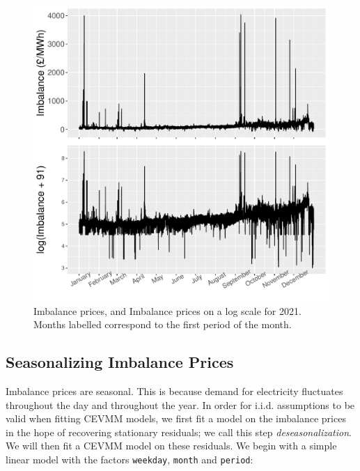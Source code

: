 \documentclass[11pt,twoside,openany]{book}
\newcommand{\code}[1]{\texttt{#1}}
\numberwithin{Theorem}{chapter}
\numberwithin{Definition}{chapter}
\numberwithin{Lemma}{chapter}
\numberwithin{Algorithm}{chapter}
\numberwithin{equation}{chapter}
\begin{document}
\FloatBarrier
\begin{figure}[htp]
  \centering
  \includegraphics[scale=0.75]{../elexon/figures/imbalance_whole_year.pdf}
  \caption{Imbalance prices, and Imbalance prices on a log scale for
  2021. Months labelled correspond to the first period of the month.}\label{fig:whole_year_imbalance_price}
\end{figure}



\subsection{Seasonalizing Imbalance Prices}

Imbalance prices are seasonal. This is because
demand for electricity fluctuates throughout the day and throughout the
year. In order for i.i.d. assumptions to be valid when fitting CEVMM models,
we first fit a model on the imbalance prices in the hope of recovering
stationary residuals; we call this step {\it deseasonalization}.
We will then fit a CEVMM model on these residuals.
We begin with a simple linear model with the factors \code{weekday}, \code{month}
and \code{period}:
\end{document}
